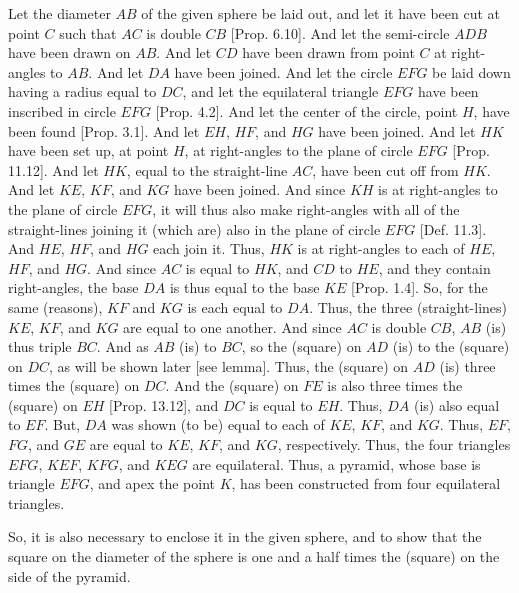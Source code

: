 \begin{Parallel}{}{}
{\epsfysize=3.5in
\centerline{}

Let the diameter $AB$ of the given sphere be laid out, and let it have been
cut at point $C$ such that $AC$ is double $CB$ [Prop. 6.10]. And let the semi-circle 
$ADB$  have been drawn on $AB$. And let $CD$ have been drawn from point
$C$ at right-angles to $AB$. And let $DA$ have been joined. 
And let the circle $EFG$ be laid down having a radius equal to $DC$,
and let the equilateral triangle $EFG$ have been inscribed in circle
$EFG$ [Prop. 4.2]. And let the center of the circle, point $H$,
have been found [Prop. 3.1]. And let $EH$, $HF$, and $HG$ have been
joined. And let $HK$ have been set up, at point $H$, at right-angles to the
plane of circle $EFG$ [Prop. 11.12]. And let $HK$, equal to the straight-line $AC$, have been cut off from $HK$. And let $KE$, $KF$, and $KG$ have been joined.
And since $KH$ is at right-angles to the plane of circle $EFG$, it will
thus also make right-angles with all of the straight-lines joining it
(which are) also in the plane of circle $EFG$ [Def. 11.3]. And $HE$, $HF$,
and $HG$ each join it. Thus, $HK$ is at right-angles to each of $HE$,
$HF$, and $HG$. And since  $AC$ is equal to $HK$, and $CD$ to
$HE$, and they contain right-angles, the base $DA$ is thus equal to the base 
$KE$ [Prop. 1.4]. So, for the same (reasons),  $KF$ and
$KG$ is each equal to $DA$. Thus, the three (straight-lines)
$KE$, $KF$, and $KG$ are equal to one another. And since 
$AC$ is double $CB$, $AB$ (is) thus triple $BC$. And as 
$AB$ (is) to $BC$, so the (square) on $AD$ (is) to the (square)
on $DC$, as will be shown later [see lemma]. Thus, the (square)
on $AD$ (is) three times the (square) on $DC$. And the (square)
on $FE$ is also three times the (square) on $EH$ [Prop. 13.12], 
and $DC$ is equal to $EH$. Thus, $DA$ (is) also equal to $EF$.
But, $DA$ was shown (to be) equal to each of $KE$, $KF$, and
$KG$. Thus, $EF$, $FG$, and $GE$ are equal to 
$KE$, $KF$, and $KG$, respectively. Thus, the four triangles $EFG$, $KEF$,
$KFG$, and $KEG$ are equilateral. Thus, a pyramid, whose base is triangle
$EFG$, and apex the point $K$,   has been
constructed from four equilateral triangles.

So, it is also necessary to enclose it in the given sphere, and to show that
the square on the diameter of the sphere is one and a half times the (square)
on the side of the pyramid. 

}
\end{Parallel}
